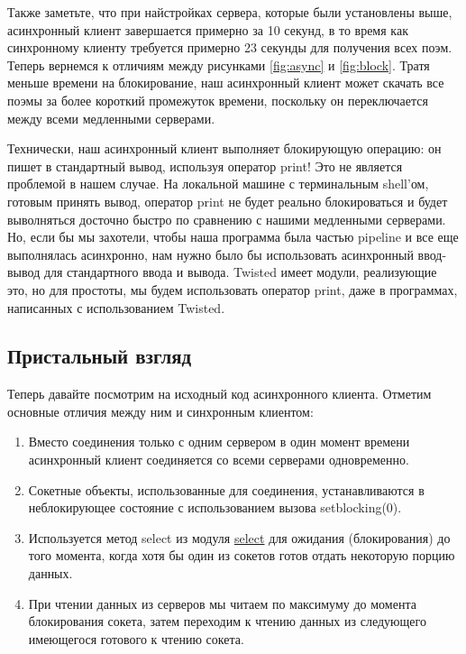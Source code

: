 Также заметьте, что при найстройках сервера, которые были установлены 
выше, асинхронный 
клиент завершается примерно за 10 секунд, в то время как 
синхронному клиенту требуется примерно 23 секунды для получения 
всех поэм. Теперь вернемся к отличиям между рисунками \ref{fig:async} и 
\ref{fig:block}. Тратя меньше времени на блокирование, наш 
асинхронный клиент может скачать все поэмы за более короткий промежуток 
времени, поскольку он переключается между всеми медленными серверами.


Технически, наш асинхронный клиент выполняет блокирующую операцию: 
он пишет в стандартный вывод, используя оператор print! Это не 
является проблемой в нашем случае. На локальной машине с 
терминальным shell'ом, готовым принять вывод, оператор print 
не будет реально блокироваться и будет выволняться досточно быстро 
по сравнению с нашими медленными серверами. Но, если бы мы захотели, 
чтобы наша программа была частью pipeline и все еще выполнялась 
асинхронно, нам нужно было бы использовать асинхронный ввод-вывод 
для стандартного ввода и вывода. Twisted имеет модули, реализующие это, 
но для простоты, мы будем использовать 
оператор print, даже в программах, написанных с использованием Twisted.


\subsection{Пристальный взгляд}


    Теперь давайте посмотрим на исходный код асинхронного клиента. 
Отметим основные отличия между ним и синхронным клиентом:

\begin{enumerate}
\item Вместо соединения только с одним сервером в один момент времени  
асинхронный клиент соединяется со всеми серверами одновременно.

\item Сокетные объекты, использованные для соединения, устанавливаются в неблокирующее 
состояние с использованием вызова setblocking(0).

\item Используется метод select из модуля 
\href{http://docs.python.org/library/select.html#module-select}{select} для ожидания (блокирования) 
до того момента, когда хотя бы один из сокетов готов отдать некоторую 
порцию данных.

\item При чтении данных из серверов мы читаем по максимуму до 
момента блокирования сокета, затем переходим к чтению данных 
из следующего имеющегося готового к чтению сокета. 
\end{enumerate}


